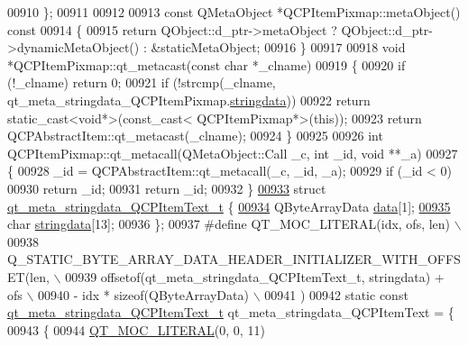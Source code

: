 \begin{DoxyCode}
00910 \};
00911 
00912 
00913 \textcolor{keyword}{const} QMetaObject *QCPItemPixmap::metaObject()\textcolor{keyword}{ const}
00914 \textcolor{keyword}{}\{
00915     \textcolor{keywordflow}{return} QObject::d\_ptr->metaObject ? QObject::d\_ptr->dynamicMetaObject() : &staticMetaObject;
00916 \}
00917 
00918 \textcolor{keywordtype}{void} *QCPItemPixmap::qt\_metacast(\textcolor{keyword}{const} \textcolor{keywordtype}{char} *\_clname)
00919 \{
00920     \textcolor{keywordflow}{if} (!\_clname) \textcolor{keywordflow}{return} 0;
00921     \textcolor{keywordflow}{if} (!strcmp(\_clname, qt\_meta\_stringdata\_QCPItemPixmap.\hyperlink{a00016_a4cee80f7af4fafbb06fc161890ced10e}{stringdata}))
00922         \textcolor{keywordflow}{return} \textcolor{keyword}{static\_cast<}\textcolor{keywordtype}{void}*\textcolor{keyword}{>}(\textcolor{keyword}{const\_cast<} QCPItemPixmap*\textcolor{keyword}{>}(\textcolor{keyword}{this}));
00923     \textcolor{keywordflow}{return} QCPAbstractItem::qt\_metacast(\_clname);
00924 \}
00925 
00926 \textcolor{keywordtype}{int} QCPItemPixmap::qt\_metacall(QMetaObject::Call \_c, \textcolor{keywordtype}{int} \_id, \textcolor{keywordtype}{void} **\_a)
00927 \{
00928     \_id = QCPAbstractItem::qt\_metacall(\_c, \_id, \_a);
00929     \textcolor{keywordflow}{if} (\_id < 0)
00930         \textcolor{keywordflow}{return} \_id;
00931     \textcolor{keywordflow}{return} \_id;
00932 \}
\hypertarget{a00016_source_l00933}{}\hyperlink{a00016}{00933} \textcolor{keyword}{struct }\hyperlink{a00016_db/d57/a00112}{qt\_meta\_stringdata\_QCPItemText\_t} \{
\hypertarget{a00016_source_l00934}{}\hyperlink{a00016_ae37b5edc1ab54bceebcfba0fb33002ec}{00934}     QByteArrayData \hyperlink{a00016_ae37b5edc1ab54bceebcfba0fb33002ec}{data}[1];
\hypertarget{a00016_source_l00935}{}\hyperlink{a00016_aff2bfa25f79dd85cdbd854d9e51371a9}{00935}     \textcolor{keywordtype}{char} \hyperlink{a00016_aff2bfa25f79dd85cdbd854d9e51371a9}{stringdata}[13];
00936 \};
00937 \textcolor{preprocessor}{#define QT\_MOC\_LITERAL(idx, ofs, len) \(\backslash\)}
00938 \textcolor{preprocessor}{    Q\_STATIC\_BYTE\_ARRAY\_DATA\_HEADER\_INITIALIZER\_WITH\_OFFSET(len, \(\backslash\)}
00939 \textcolor{preprocessor}{    offsetof(qt\_meta\_stringdata\_QCPItemText\_t, stringdata) + ofs \(\backslash\)}
00940 \textcolor{preprocessor}{        - idx * sizeof(QByteArrayData) \(\backslash\)}
00941 \textcolor{preprocessor}{    )}
00942 \textcolor{keyword}{static} \textcolor{keyword}{const} \hyperlink{a00016_db/d57/a00112}{qt\_meta\_stringdata\_QCPItemText\_t} 
      qt\_meta\_stringdata\_QCPItemText = \{
00943     \{
00944 \hyperlink{a00016_a75bb9482d242cde0a06c9dbdc6b83abe}{QT\_MOC\_LITERAL}(0, 0, 11)

\end{DoxyCode}
